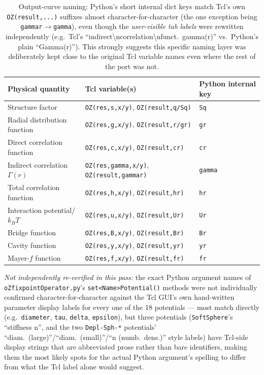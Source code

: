 \documentclass[11pt,a4paper]{article}
\newcommand{\code}[1]{\texttt{#1}}
\begin{document}
\begin{table}[h]
\centering
\small
\begin{tabular}{lll}
\toprule
Physical quantity & Tcl variable(s) & Python internal key \\
\midrule
Structure factor & \code{OZ(res,s,x/y)}, \code{OZ(result,q/Sq)} & \code{Sq} \\
Radial distribution function & \code{OZ(res,g,x/y)}, \code{OZ(result,r/gr)} & \code{gr} \\
Direct correlation function & \code{OZ(res,c,x/y)}, \code{OZ(result,cr)} & \code{cr} \\
Indirect correlation $\Gamma(r)$ & \code{OZ(res,gamma,x/y)}, \code{OZ(result,gammar)} & \code{gamma} \\
Total correlation function & \code{OZ(res,h,x/y)}, \code{OZ(result,hr)} & \code{hr} \\
Interaction potential/$k_BT$ & \code{OZ(res,u,x/y)}, \code{OZ(result,Ur)} & \code{Ur} \\
Bridge function & \code{OZ(res,B,x/y)}, \code{OZ(result,Br)} & \code{Br} \\
Cavity function & \code{OZ(res,y,x/y)}, \code{OZ(result,yr)} & \code{yr} \\
Mayer-$f$ function & \code{OZ(res,f,x/y)}, \code{OZ(result,fr)} & \code{fr} \\
\bottomrule
\end{tabular}
\caption{Output-curve naming: Python's short internal dict keys match Tcl's
own \code{OZ(result,...)} suffixes almost character-for-character (the one
exception being \code{gammar}$\to$\code{gamma}), even though the
\emph{user-visible tab labels} were rewritten independently (e.g.\ Tcl's
``indirect\textbackslash ncorrelation\textbackslash nfunct.\ gamma(r)'' vs.\
Python's plain ``Gamma(r)''). This strongly suggests this specific naming
layer was deliberately kept close to the original Tcl variable names even
where the rest of the port was not.}
\label{tab:curve-naming}
\end{table}

\emph{Not independently re-verified in this pass:} the exact Python argument
names of \code{oZfixpointOperator.py}'s \code{set<Name>Potential()} methods
were not individually confirmed character-for-character against the Tcl
GUI's own hand-written parameter display labels for every one of the 18
potentials --- most match directly (e.g.\ \code{diameter}, \code{tau},
\code{delta}, \code{epsilon}), but three potentials (\code{SoftSphere}'s
``stiffness n'', and the two \code{Depl-Sph-*} potentials' ``diam.\
(large)''/``diam.\ (small)''/``n (numb.\ dens.)'' style labels) have Tcl-side
display strings that are abbreviated prose rather than bare identifiers,
making them the most likely spots for the actual Python argument's spelling
to differ from what the Tcl label alone would suggest.
\end{document}
